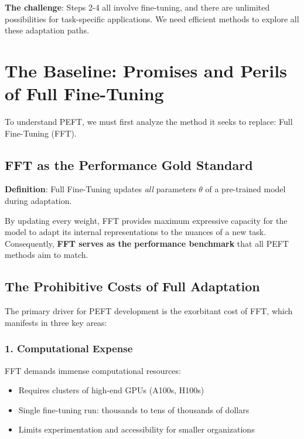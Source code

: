 \documentclass{article}
\begin{document}
\begin{center}
\end{center}

\textbf{The challenge}: Steps 2-4 all involve fine-tuning, and there are unlimited possibilities for task-specific applications. We need efficient methods to explore all these adaptation paths.

\section{The Baseline: Promises and Perils of Full Fine-Tuning}

To understand PEFT, we must first analyze the method it seeks to replace: Full Fine-Tuning (FFT).

\subsection{FFT as the Performance Gold Standard}

\textbf{Definition}: Full Fine-Tuning updates \textit{all} parameters $\theta$ of a pre-trained model during adaptation.

By updating every weight, FFT provides maximum expressive capacity for the model to adapt its internal representations to the nuances of a new task. Consequently, \textbf{FFT serves as the performance benchmark} that all PEFT methods aim to match.

\subsection{The Prohibitive Costs of Full Adaptation}

The primary driver for PEFT development is the exorbitant cost of FFT, which manifests in three key areas:

\subsubsection{1. Computational Expense}

FFT demands immense computational resources:
\begin{itemize}
\item Requires clusters of high-end GPUs (A100s, H100s)
\item Single fine-tuning run: thousands to tens of thousands of dollars
\item Limits experimentation and accessibility for smaller organizations
\end{itemize}
\end{document}
